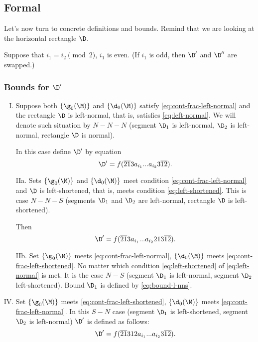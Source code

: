 \subsection{Formal}
\label{sbsc:boundaries_formal}

Let's now turn to concrete definitions and bounds.
Remind that we are looking at the horizontal rectangle $\D$.

Suppose that $i_1 = i_2 \pmod 2$, $i_1$ is even. (If $i_1$ is odd, then $\D'$ and $\D''$ are swapped.)

\subsubsection{Bounds for $\D'$}

\begin{enumerate}[I.]
	\item Suppose both $\{\g_0(\M)\}$ and $\{\d_0(\M)\}$
	satisfy \ref{eq:cont-frac-left-normal} and the rectangle $\D$ is left-normal,
	that is, satisfies \ref{eq:left-normal}.
	We will denote such situation by $N-N-N$
	(segment $\D_1$ is left-normal, $\D_2$ is left-normal, rectangle $\D$ is normal).
	
	In this case define $\D'$ by equation
	\begin{equation}
		\D' = f(\overline{21}3a_{i_1}... a_{i_2}3\overline{12}).
	\end{equation}
	
	\item[IIa.] Sets $\{\g_0(\M)\}$ and $\{\d_0(\M)\}$
	meet condition \ref{eq:cont-frac-left-normal}
	and $\D$ is left-shortened, that is, meets condition \ref{eq:left-shortened}.
	This is case $N-N-S$
	(segments $\D_1$ and $\D_2$ are left-normal, rectangle $\D$ is left-shortened).
	
	Then
	\begin{equation}\label{eq:bound-l-nns}
		\D' = f(\overline{21}3a_{i_1}... a_{i_2}213\overline{12}).
	\end{equation}
	
	\item[IIb.] Set $\{\g_0(\M)\}$ meets \ref{eq:cont-frac-left-normal},
	$\{\d_0(\M)\}$ meets \ref{eq:cont-frac-left-shortened}.
	No matter which condition \ref{eq:left-shortened} of \ref{eq:left-normal} is met.
	It is the case $N-S$
	(segment $\D_1$ is left-normal, segment $\D_2$ left-shortened).
	Bound $\D_1$ is defined by \ref{eq:bound-l-nns}.
	
	\addtocounter{enumi}{1}
	\item Set $\{\g_0(\M)\}$ meets \ref{eq:cont-frac-left-shortened},
	$\{\d_0(\M)\}$ meets \ref{eq:cont-frac-left-normal}.
	In this $S-N$ case
	(segment $\D_1$ is left-shortened, segment $\D_2$ is left-normal)
	$\D'$ is defined as follows:
	\begin{equation}
		\D' = f(\overline{21}312a_{i_1}... a_{i_2}3\overline{12}).
	\end{equation}
	

\end{enumerate}
